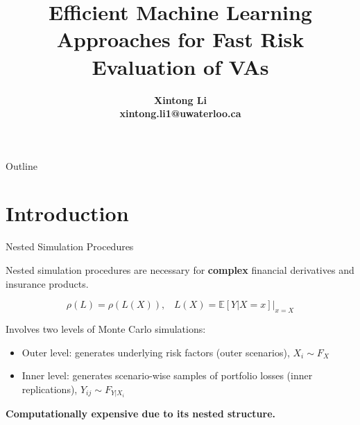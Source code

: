 \documentclass[9pt,handout]{beamer}
\title[\textbf{Resilient Machine Learning Approaches for Fast Risk Evaluation and Management in Financial Portfolios and Variable Annuities}]{Efficient Machine Learning Approaches for Fast Risk Evaluation of VAs}
\author[\textbf{Xintong Li, xintong.li1@uwaterloo.ca}]
{\Large\bfseries
Xintong Li\\\medskip
xintong.li1@uwaterloo.ca
} %
\institute[\textbf{University of Waterloo, Actuarial Science}] %
{\large\bfseries
Dept. Statistics and Actuarial Science\\\smallskip
University of Waterloo %
}
\begin{document}
{
\beamertemplatenavigationsymbolsempty
\begin{frame}[plain]
\titlepage
\end{frame}
}

{
\beamertemplatenavigationsymbolsempty
{}
{ }
\begin{frame}{Outline}
\tableofcontents
\end{frame}
}
\addtocounter{framenumber}{-2}


\section{Introduction}

\begin{frame}{Nested Simulation Procedures}

Nested simulation procedures are necessary for \textbf{complex} financial derivatives and insurance products.

$$\rho(L) = \rho(L(X)), \;\;\; L(X) = \mathbb{E}\left[ Y|X=x \right]\vert_{x=X}  $$

Involves two levels of Monte Carlo simulations:
\begin{itemize}
    \item Outer level: generates underlying risk factors (outer scenarios), $X_i \sim F_X$
    \item Inner level: generates scenario-wise samples of portfolio losses (inner replications), $Y_{ij} \sim F_{Y|X_i}$
\end{itemize}

\textbf{Computationally expensive due to its nested structure.}

\end{frame}
\end{document}
